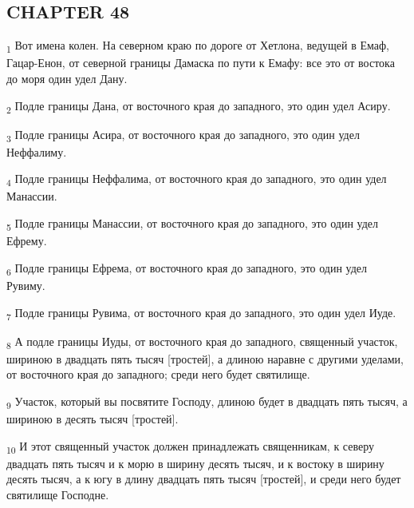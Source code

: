 \subsection{CHAPTER 48}
\begin{tcolorbox}
\textsubscript{1} Вот имена колен. На северном краю по дороге от Хетлона, ведущей в Емаф, Гацар-Енон, от северной границы Дамаска по пути к Емафу: все это от востока до моря один удел Дану.
\end{tcolorbox}
\begin{tcolorbox}
\textsubscript{2} Подле границы Дана, от восточного края до западного, это один удел Асиру.
\end{tcolorbox}
\begin{tcolorbox}
\textsubscript{3} Подле границы Асира, от восточного края до западного, это один удел Неффалиму.
\end{tcolorbox}
\begin{tcolorbox}
\textsubscript{4} Подле границы Неффалима, от восточного края до западного, это один удел Манассии.
\end{tcolorbox}
\begin{tcolorbox}
\textsubscript{5} Подле границы Манассии, от восточного края до западного, это один удел Ефрему.
\end{tcolorbox}
\begin{tcolorbox}
\textsubscript{6} Подле границы Ефрема, от восточного края до западного, это один удел Рувиму.
\end{tcolorbox}
\begin{tcolorbox}
\textsubscript{7} Подле границы Рувима, от восточного края до западного, это один удел Иуде.
\end{tcolorbox}
\begin{tcolorbox}
\textsubscript{8} А подле границы Иуды, от восточного края до западного, священный участок, шириною в двадцать пять тысяч [тростей], а длиною наравне с другими уделами, от восточного края до западного; среди него будет святилище.
\end{tcolorbox}
\begin{tcolorbox}
\textsubscript{9} Участок, который вы посвятите Господу, длиною будет в двадцать пять тысяч, а шириною в десять тысяч [тростей].
\end{tcolorbox}
\begin{tcolorbox}
\textsubscript{10} И этот священный участок должен принадлежать священникам, к северу двадцать пять тысяч и к морю в ширину десять тысяч, и к востоку в ширину десять тысяч, а к югу в длину двадцать пять тысяч [тростей], и среди него будет святилище Господне.
\end{tcolorbox}
